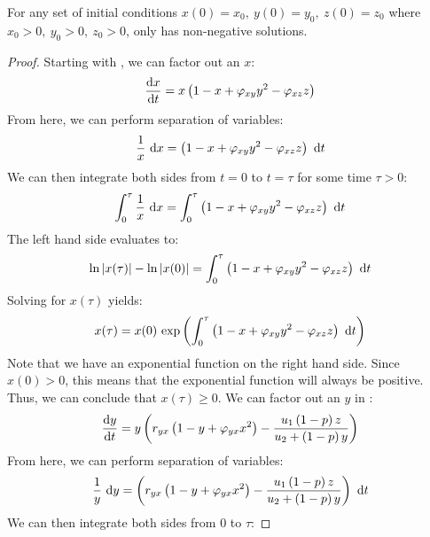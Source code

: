 \begin{theorem}\label{thm:positiveness}
    For any set of initial conditions $x(0)=x_0,\ y(0)=y_0,\ z(0)=z_0$ where $x_0>0,\ y_0>0,\ z_0>0$,  only has non-negative solutions.
\end{theorem}
\begin{proof}
    Starting with , we can factor out an $x$:
    \begin{equation*}
        \diff[]{x}{t}=x\left(1-x+\varphi_{xy}y^2-\varphi_{xz}z\right)
    \end{equation*}
    From here, we can perform separation of variables:
    \begin{equation*}
        \frac{1}{x}\ \opdiff{x}=\left(1-x+\varphi_{xy}y^2-\varphi_{xz}z\right)\ \opdiff{t}
    \end{equation*}
    We can then integrate both sides from $t=0$ to $t=\tau$ for some time $\tau>0$:
    \begin{equation*}
        \int_0^\tau\frac{1}{x}\ \opdiff{x}=\int_0^\tau\left(1-x+\varphi_{xy}y^2-\varphi_{xz}z\right)\ \opdiff{t}
    \end{equation*}
    The left hand side evaluates to:
    \begin{equation*}
        \ln{x(\tau)}-\ln{x(0)}=\int_0^\tau\left(1-x+\varphi_{xy}y^2-\varphi_{xz}z\right)\ \opdiff{t}
    \end{equation*}
    Solving for $x(\tau)$ yields:
    \begin{equation*}
        x(\tau) = x(0)\ \text{exp}\left( \int_0^\tau \left(1-x+\varphi_{xy}y^2-\varphi_{xz}z\right)\ \mathrm{d}t \right)
    \end{equation*}
    Note that we have an exponential function on the right hand side. Since $x(0) > 0$, this means that the exponential function will always be positive. Thus, we can conclude that $x(\tau) \geq 0$. We can factor out an $y$ in :
    \begin{equation*}
        \diff[]{y}{t} = y\left(r_{yx}\left(1-y+\varphi_{yx}x^2\right)-\frac{u_1\left(1-p\right)z}{u_2+\left(1-p\right)y}\right)
    \end{equation*}
    From here, we can perform separation of variables:
    \begin{equation*}
        \frac{1}{y}\ \opdiff{y} = \left(r_{yx}\left(1-y+\varphi_{yx}x^2\right)-\frac{u_1\left(1-p\right)z}{u_2+\left(1-p\right)y}\right)\ \opdiff{t}
    \end{equation*}
    We can then integrate both sides from 0 to $\tau$:

\end{proof}
